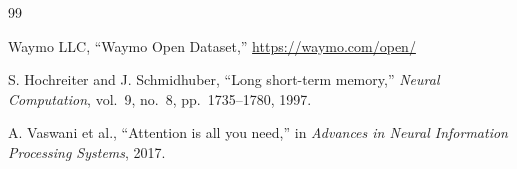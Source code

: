 \documentclass[letterpaper, 10 pt, conference]{ieeeconf}
\begin{document}
\begin{thebibliography}{99}

Waymo LLC, ``Waymo Open Dataset,'' \url{https://waymo.com/open/}

S. Hochreiter and J. Schmidhuber, ``Long short-term memory,'' \textit{Neural Computation}, vol.~9, no.~8, pp.~1735--1780, 1997.

A. Vaswani et al., ``Attention is all you need,'' in \textit{Advances in Neural Information Processing Systems}, 2017.

\end{thebibliography}

\end{document}
